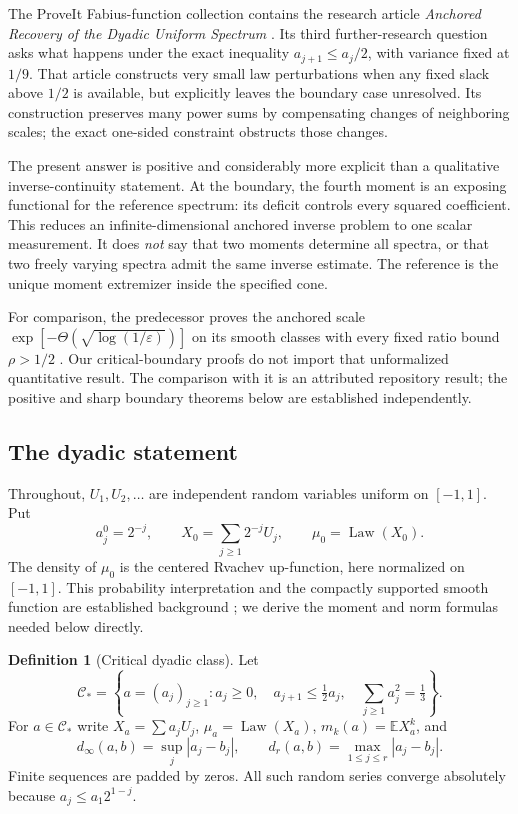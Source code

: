 \documentclass[11pt,a4paper]{article}
\numberwithin{equation}{section}
\theoremstyle{definition}
\newtheorem{definition}[theorem]{Definition}
\theoremstyle{remark}
\DeclareMathOperator{\Law}{Law}
\newcommand{\E}{\mathbb E}
\newcommand{\C}{\mathcal C}
\newcommand{\eps}{\varepsilon}
\begin{document}
The ProveIt Fabius-function collection contains the research article
\emph{Anchored Recovery of the Dyadic Uniform Spectrum} \cite{anchored}.
Its third further-research question asks what happens under the exact inequality
$a_{j+1}\le a_j/2$, with variance fixed at $1/9$. That article constructs
very small law perturbations when any fixed slack above $1/2$ is available,
but explicitly leaves the boundary case unresolved. Its construction preserves
many power sums by compensating changes of neighboring scales; the exact
one-sided constraint obstructs those changes.

The present answer is positive and considerably more explicit than a qualitative
inverse-continuity statement. At the boundary, the fourth moment is an exposing
functional for the reference spectrum: its deficit controls every squared
coefficient. This reduces an infinite-dimensional anchored inverse problem to
one scalar measurement. It does \emph{not} say that two moments determine all
spectra, or that two freely varying spectra admit the same inverse estimate.
The reference is the unique moment extremizer inside the specified cone.

For comparison, the predecessor proves the anchored scale
$\exp[-\Theta(\sqrt{\log(1/\eps)})]$ on its smooth classes with every fixed
ratio bound $\rho>1/2$ \cite{anchored}. Our critical-boundary proofs do not
import that unformalized quantitative result. The comparison with it is an
attributed repository result; the positive and sharp boundary theorems below
are established independently.

\subsection{The dyadic statement}

Throughout, $U_1,U_2,\ldots$ are independent random variables uniform on
$[-1,1]$. Put
\begin{equation}
 a_j^0=2^{-j},\qquad X_0=\sum_{j\ge1}2^{-j}U_j,
 \qquad \mu_0=\Law(X_0).
\end{equation}
The density of $\mu_0$ is the centered Rvachev up-function, here normalized
on $[-1,1]$. This probability interpretation and the compactly supported smooth
function are established background \cite{arias}; we derive the moment and
norm formulas needed below directly.

\begin{definition}[Critical dyadic class]
\label{def:critical}
Let
\begin{equation}
 \C_* =\left\{a=(a_j)_{j\ge1}:a_j\ge0,\quad
 a_{j+1}\le\tfrac12a_j,\quad \sum_{j\ge1}a_j^2=\tfrac13\right\}.
 \label{eq:critical-class}
\end{equation}
For $a\in\C_*$ write $X_a=\sum a_jU_j$, $\mu_a=\Law(X_a)$,
$m_k(a)=\E X_a^k$, and
\[
 d_\infty(a,b)=\sup_j|a_j-b_j|,\qquad
 d_r(a,b)=\max_{1\le j\le r}|a_j-b_j|.
\]
Finite sequences are padded by zeros. All such random series converge
absolutely because $a_j\le a_1 2^{1-j}$.
\end{definition}
\end{document}
